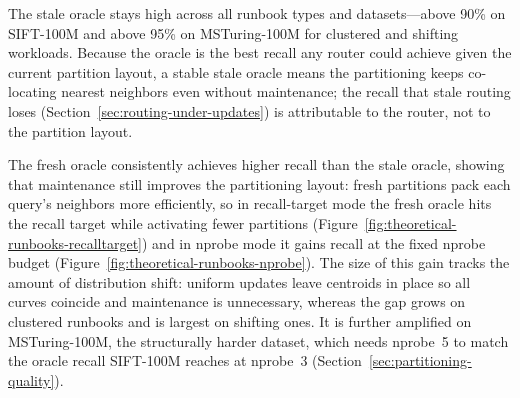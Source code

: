 \documentclass[sigconf,review,anonymous]{acmart}
\newcommand{\dk}[1]{\textcolor{teal}{(DK: #1)}}
\begin{document}

The stale oracle stays high across all runbook types and datasets---above 90\% on SIFT-100M and above 95\% on MSTuring-100M for clustered and shifting workloads. Because the oracle is the best recall any router could achieve given the current partition layout, a stable stale oracle means the partitioning keeps co-locating nearest neighbors even without maintenance; the recall that stale routing loses (Section~\ref{sec:routing-under-updates}) is attributable to the router, not to the partition layout.

The fresh oracle consistently achieves higher recall than the stale oracle, showing that maintenance still improves the partitioning layout: fresh partitions pack each query's neighbors more efficiently, so in recall-target mode the fresh oracle hits the recall target while activating fewer partitions (Figure~\ref{fig:theoretical-runbooks-recalltarget}) and in nprobe mode it gains recall at the fixed nprobe budget (Figure~\ref{fig:theoretical-runbooks-nprobe}). The size of this gain tracks the amount of distribution shift: uniform updates leave centroids in place so all curves coincide and maintenance is unnecessary, whereas the gap grows on clustered runbooks and is largest on shifting ones. It is further amplified on MSTuring-100M, the structurally harder dataset, which needs nprobe~5 to match the oracle recall SIFT-100M reaches at nprobe~3 (Section~\ref{sec:partitioning-quality}).


\end{document}
